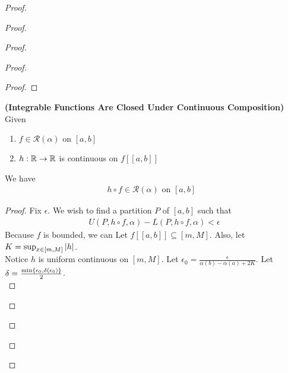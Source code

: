 \documentclass{report}
\begin{document}
\begin{proof}
\begin{proof}
\begin{proof}
\begin{proof}
\begin{proof}
\end{proof}
\begin{theorem}
\label{7.1.17}
\textbf{(Integrable Functions Are Closed Under Continuous Composition)} Given 
\begin{enumerate}[label=(\alph*)]
  \item $f\in \mathscr{R}(\alpha )\text{ on $[a,b]$ }$
  \item $h:\mathbb{R}\rightarrow \mathbb{R}$ is continuous on $f[[a,b]]$
\end{enumerate}
We have 
\begin{align*}
h\circ f\in\mathscr{R}(\alpha )\text{ on $[a,b]$ }
\end{align*}
\end{theorem}
\begin{proof}
Fix $\epsilon $. We wish to find a partition $P$ of $[a,b]$ such that 
\begin{align*}
U(P,h\circ f,\alpha )-L(P,h\circ f,\alpha )<\epsilon 
\end{align*}
Because $f$ is bounded, we can Let $f[[a,b]]\subseteq [m,M]$. Also, let $K=\sup_{x\in [m,M]} |h|$.\\


Notice $h$ is uniform continuous on $[m,M]$. Let $\epsilon_0=\frac{\epsilon }{\alpha (b)-\alpha (a)+2K}$. Let $\delta=\frac{\min  \{ \epsilon_0, \delta(\epsilon_0) \}}{2}$.\\


\end{proof}
\end{proof}
\end{proof}
\end{proof}
\end{proof}
\end{document}

